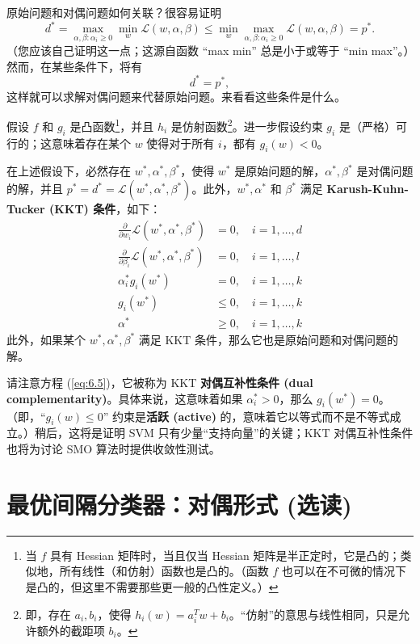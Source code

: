 原始问题和对偶问题如何关联？很容易证明
\[
    d^* = \max_{\alpha, \beta: \alpha_i \ge 0} \min_w \mathcal{L}(w, \alpha, \beta) \le \min_w \max_{\alpha, \beta: \alpha_i \ge 0} \mathcal{L}(w, \alpha, \beta) = p^*.
\]
（您应该自己证明这一点；这源自函数 “max min” 总是小于或等于 “min max”。）然而，在某些条件下，将有
\[
    d^* = p^*,
\]
这样就可以求解对偶问题来代替原始问题。来看看这些条件是什么。

假设 $f$ 和 $g_i$ 是凸函数\footnote{当 $f$ 具有 Hessian 矩阵时，当且仅当 Hessian 矩阵是半正定时，它是凸的；类似地，所有线性（和仿射）函数也是凸的。（函数 $f$ 也可以在不可微的情况下是凸的，但这里不需要那些更一般的凸性定义。）}，并且 $h_i$ 是仿射函数\footnote{即，存在 $a_i, b_i$，使得 $h_i(w) = a_i^T w + b_i$。“仿射”的意思与线性相同，只是允许额外的截距项 $b_i$。}。进一步假设约束 $g_i$ 是（严格）可行的；这意味着存在某个 $w$ 使得对于所有 $i$，都有 $g_i(w) < 0$。

在上述假设下，必然存在 $w^*, \alpha^*, \beta^*$，使得 $w^*$ 是原始问题的解，$\alpha^*, \beta^*$ 是对偶问题的解，并且 $p^* = d^* = \mathcal{L}(w^*, \alpha^*, \beta^*)$。此外，$w^*, \alpha^*$ 和 $\beta^*$ 满足 \textbf{Karush-Kuhn-Tucker (KKT) 条件}，如下：
\begin{align}
    \frac{\partial}{\partial w_i} \mathcal{L}(w^*, \alpha^*, \beta^*) &= 0, \quad i = 1, \dots, d \label{eq:6.3} \\
    \frac{\partial}{\partial \beta_i} \mathcal{L}(w^*, \alpha^*, \beta^*) &= 0, \quad i = 1, \dots, l \label{eq:6.4} \\
    \alpha_i^* g_i(w^*) &= 0, \quad i = 1, \dots, k \label{eq:6.5} \\
    g_i(w^*) &\le 0, \quad i = 1, \dots, k \label{eq:6.6} \\
    \alpha^* &\ge 0, \quad i = 1, \dots, k \label{eq:6.7}
\end{align}
此外，如果某个 $w^*, \alpha^*, \beta^*$ 满足 KKT 条件，那么它也是原始问题和对偶问题的解。

请注意方程 (\ref{eq:6.5})，它被称为 KKT \textbf{对偶互补性条件 (dual complementarity)}。具体来说，这意味着如果 $\alpha_i^* > 0$，那么 $g_i(w^*) = 0$。（即，“$g_i(w) \le 0$” 约束是\textbf{活跃 (active)} 的，意味着它以等式而不是不等式成立。）稍后，这将是证明 SVM 只有少量“支持向量”的关键；KKT 对偶互补性条件也将为讨论 SMO 算法时提供收敛性测试。

\section{最优间隔分类器：对偶形式 (选读)}

